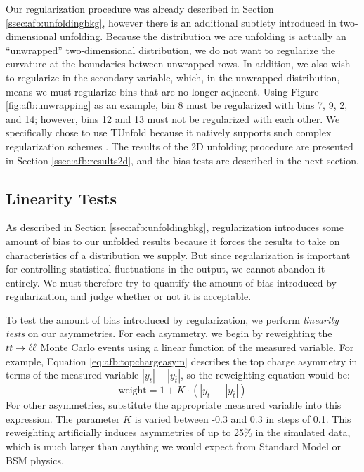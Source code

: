Our regularization procedure was already described in Section
\ref{ssec:afb:unfoldingbkg}, however there is an additional subtlety
introduced in two-dimensional unfolding. Because the distribution we
are unfolding is actually an ``unwrapped'' two-dimensional
distribution, we do not want to regularize the curvature at the
boundaries between unwrapped rows. In addition, we also wish to
regularize in the secondary variable, which, in the unwrapped
distribution, means we must regularize bins that are no longer
adjacent. Using Figure \ref{fig:afb:unwrapping} as an example, bin 8
must be regularized with bins 7, 9, 2, and 14; however, bins 12 and 13
must not be regularized with each other.
We specifically chose to use TUnfold because it natively supports such
complex regularization schemes \cite{tunfold}. The results of the 2D unfolding
procedure are presented in Section \ref{ssec:afb:results2d}, and the
bias tests are described in the next section.

\subsection{Linearity Tests}
\label{ssec:afb:unfoldingtests}

As described in Section \ref{ssec:afb:unfoldingbkg}, regularization
introduces some amount of bias to our unfolded results because it
forces the results to take on characteristics of a distribution
we supply. But since regularization is important for
controlling statistical fluctuations in the output, we cannot abandon
it entirely. We must therefore try to quantify the amount of bias
introduced by regularization, and judge whether or not it is acceptable.

To test the amount of bias introduced by regularization, we perform
\emph{linearity tests} on our asymmetries. For each asymmetry, we
begin by reweighting the $t\bar{t} \rightarrow \ell\ell$ Monte Carlo events using a linear
function of the measured variable. For example, Equation
\ref{eq:afb:topchargeasym} describes the top charge asymmetry in terms
of the measured variable $|y_t| - |y_{\bar{t}}|$, so the reweighting
equation would be:
\begin{equation}
\text{weight} = 1 + K \cdot (|y_t| - |y_{\bar{t}}|)
\end{equation}
For other asymmetries, substitute the appropriate measured variable
into this expression. The parameter $K$ is varied between -0.3 and 0.3
in steps of 0.1. This reweighting artificially induces asymmetries of up to
25\% in the simulated data, which is much larger than anything we
would expect from Standard Model or BSM physics.

